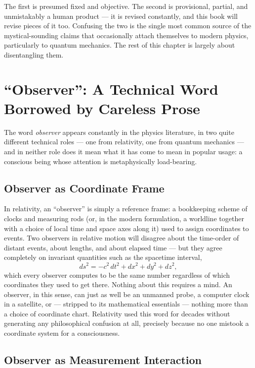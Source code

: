\noindent The first is presumed fixed and objective. The second is
provisional, partial, and unmistakably a human product --- it is revised
constantly, and this book will revise pieces of it too. Confusing the two is
the single most common source of the mystical-sounding claims that
occasionally attach themselves to modern physics, particularly to quantum
mechanics. The rest of this chapter is largely about disentangling them.

\section{``Observer'': A Technical Word Borrowed by Careless Prose}
\label{sec:observer}

The word \emph{observer} appears constantly in the physics literature, in
two quite different technical roles --- one from relativity, one from
quantum mechanics --- and in neither role does it mean what it has come to
mean in popular usage: a conscious being whose attention is metaphysically
load-bearing.

\subsection{Observer as Coordinate Frame}

In relativity, an ``observer'' is simply a reference frame: a bookkeeping
scheme of clocks and measuring rods (or, in the modern formulation, a
worldline together with a choice of local time and space axes along it)
used to assign coordinates to events. Two observers in relative motion will
disagree about the time-order of distant events, about lengths, and about
elapsed time --- but they agree completely on invariant quantities such as
the spacetime interval,
\begin{equation}
  ds^2 = -c^2\,dt^2 + dx^2 + dy^2 + dz^2 ,
\end{equation}
which every observer computes to be the same number regardless of which
coordinates they used to get there. Nothing about this requires a mind.
An observer, in this sense, can just as well be an unmanned probe, a
computer clock in a satellite, or --- stripped to its mathematical
essentials --- nothing more than a choice of coordinate chart. Relativity
used this word for decades without generating any philosophical confusion
at all, precisely because no one mistook a coordinate system for a
consciousness.

\subsection{Observer as Measurement Interaction}

